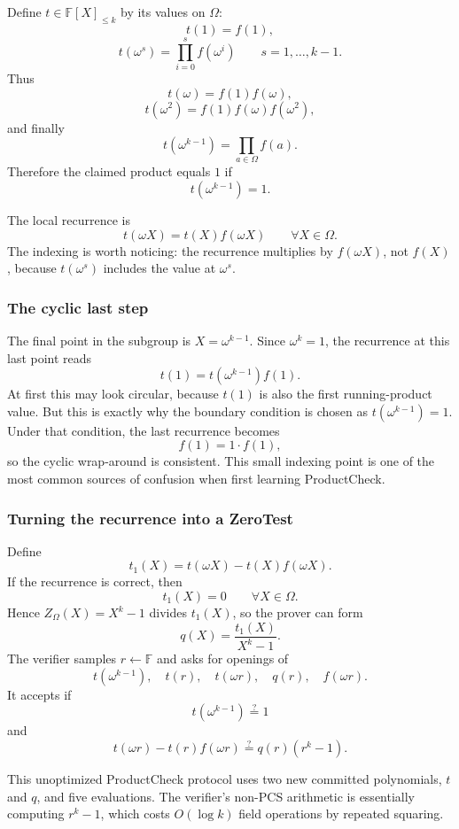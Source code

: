 \documentclass[11pt]{article}
\newcommand{\F}{\mathbb{F}}
\newcommand{\polydeg}[1]{\F[X]_{\le #1}}
\begin{document}
Define $t\in\polydeg{k}$ by its values on $\Omega$:
\[
    t(1)=f(1),
\]
\[
    t(\omega^s)=\prod_{i=0}^{s}f(\omega^i)
    \qquad s=1,\ldots,k-1.
\]
Thus
\[
    t(\omega)=f(1)f(\omega),
\]
\[
    t(\omega^2)=f(1)f(\omega)f(\omega^2),
\]
and finally
\[
    t(\omega^{k-1})=\prod_{a\in\Omega}f(a).
\]
Therefore the claimed product equals $1$ if
\[
    t(\omega^{k-1})=1.
\]

The local recurrence is
\[
    t(\omega X)=t(X)f(\omega X)
    \qquad\forall X\in\Omega.
\]
The indexing is worth noticing: the recurrence multiplies by $f(\omega X)$, not $f(X)$, because $t(\omega^s)$ includes the value at $\omega^s$.

\subsubsection*{The cyclic last step}

The final point in the subgroup is $X=\omega^{k-1}$. Since $\omega^k=1$, the recurrence at this last point reads
\[
    t(1)=t(\omega^{k-1})f(1).
\]
At first this may look circular, because $t(1)$ is also the first running-product value. But this is exactly why the boundary condition is chosen as $t(\omega^{k-1})=1$. Under that condition, the last recurrence becomes
\[
    f(1)=1\cdot f(1),
\]
so the cyclic wrap-around is consistent. This small indexing point is one of the most common sources of confusion when first learning ProductCheck.

\subsubsection*{Turning the recurrence into a ZeroTest}

Define
\[
    t_1(X)=t(\omega X)-t(X)f(\omega X).
\]
If the recurrence is correct, then
\[
    t_1(X)=0\qquad \forall X\in\Omega.
\]
Hence $Z_\Omega(X)=X^k-1$ divides $t_1(X)$, so the prover can form
\[
    q(X)=\frac{t_1(X)}{X^k-1}.
\]
The verifier samples $r\leftarrow\F$ and asks for openings of
\[
    t(\omega^{k-1}),\quad t(r),\quad t(\omega r),\quad q(r),\quad f(\omega r).
\]
It accepts if
\[
    t(\omega^{k-1})\stackrel{?}{=}1
\]
and
\[
    t(\omega r)-t(r)f(\omega r)
    \stackrel{?}{=}
    q(r)(r^k-1).
\]

This unoptimized ProductCheck protocol uses two new committed polynomials, $t$ and $q$, and five evaluations. The verifier's non-PCS arithmetic is essentially computing $r^k-1$, which costs $O(\log k)$ field operations by repeated squaring.
\end{document}
